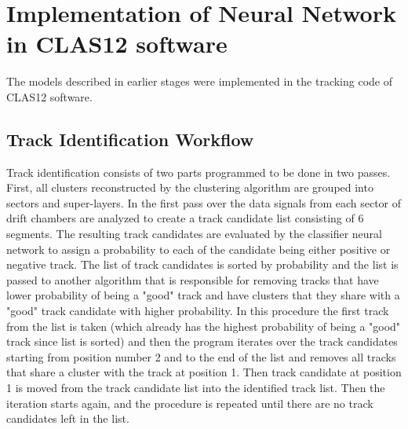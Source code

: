 \section{Implementation of Neural Network in CLAS12 software}

The models described in earlier stages were implemented in the tracking code of CLAS12 
software. 


\subsection{Track Identification Workflow}

 Track identification consists of two parts programmed to be done in two passes.
First, all clusters reconstructed by the clustering algorithm are grouped into sectors and super-layers.
In the first pass over the data signals from each sector of drift chambers are analyzed to create a track 
candidate list consisting of 6 segments.
The resulting track candidates are evaluated by the classifier neural network to assign a probability to each 
of the candidate being either positive or negative track. The list of track candidates is sorted by probability and the list is passed
to another algorithm that is responsible for removing tracks that have lower probability of being a "good" track and have
clusters that they share with a "good" track candidate with higher probability. In this procedure the first track from 
the list is taken (which already has the highest probability of being a "good" track since list is sorted) and then the program
iterates over the track candidates starting from position number 2 and to the end of the list and removes all tracks that share a 
cluster with the track at position 1. Then track candidate at position 1 is moved from the track candidate list into the identified
track list. Then the iteration starts again, and the procedure is repeated until there are no track candidates left in the list.

